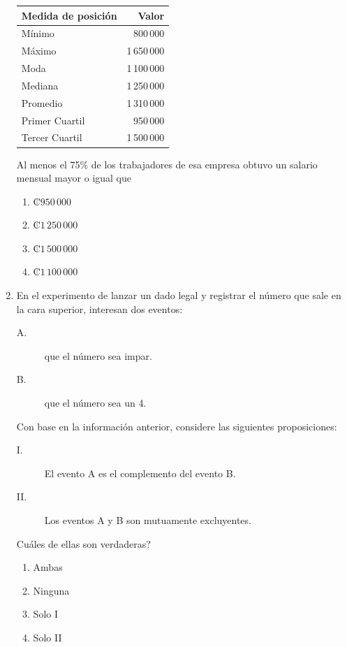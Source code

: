 \documentclass[12pt]{article}
\begin{document}
\begin{enumerate}[label=\textbf{\arabic*.}, itemsep=2.5cm]
\begin{center}
\begin{tabular}{|l|r|}
\hline
\textbf{Medida de posici\'on} & \textbf{Valor} \\
\hline
M\'inimo         & 800\,000 \\
M\'aximo         & 1\,650\,000 \\
Moda           & 1\,100\,000 \\
Mediana        & 1\,250\,000 \\
Promedio       & 1\,310\,000 \\
Primer Cuartil & 950\,000 \\
Tercer Cuartil & 1\,500\,000 \\
\hline
\end{tabular}
\end{center}

Al menos el 75\% de los trabajadores de esa empresa obtuvo un salario mensual mayor o igual que

\begin{enumerate}[label=\Alph*)]
  \item \mbox{₡$950\,000$}
  \item \mbox{₡$1\,250\,000$}
  \item \mbox{₡$1\,500\,000$}
  \item \mbox{₡$1\,100\,000$}
\end{enumerate}

\Needspace{0.55\textheight}
\item
En el experimento de lanzar un dado legal y registrar el n\'umero que sale en la cara superior, interesan dos eventos:

\begin{description}
  \item[A.] que el n\'umero sea impar.
  \item[B.] que el n\'umero sea un 4.
\end{description}

Con base en la informaci\'on anterior, considere las siguientes proposiciones:

\begin{description}
  \item[I.] El evento A es el complemento del evento B.
  \item[II.] Los eventos A y B son mutuamente excluyentes.
\end{description}

\textquestiondown Cu\'ales de ellas son verdaderas?

\begin{enumerate}[label=\Alph*)]
  \item Ambas
  \item Ninguna
  \item Solo I
  \item Solo II
\end{enumerate}


\end{enumerate}
\end{document}
